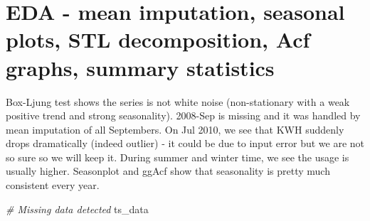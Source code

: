 \documentclass[openany]{book}
\newenvironment{Shaded}{\begin{snugshade}}{\end{snugshade}}
\newcommand{\CommentTok}[1]{\textcolor[rgb]{0.56,0.35,0.01}{\textit{#1}}}
\newcommand{\NormalTok}[1]{#1}
\begin{document}
\hypertarget{eda---mean-imputation-seasonal-plots-stl-decomposition-acf-graphs-summary-statistics}{%
\chapter{EDA - mean imputation, seasonal plots, STL decomposition, Acf
graphs, summary
statistics}\label{eda---mean-imputation-seasonal-plots-stl-decomposition-acf-graphs-summary-statistics}}

Box-Ljung test shows the series is not white noise (non-stationary with
a weak positive trend and strong seasonality). 2008-Sep is missing and
it was handled by mean imputation of all Septembers. On Jul 2010, we see
that KWH suddenly drops dramatically (indeed outlier) - it could be due
to input error but we are not so sure so we will keep it. During summer
and winter time, we see the usage is usually higher. Seasonplot and
ggAcf show that seasonality is pretty much consistent every year.

\begin{Shaded}
\begin{Highlighting}[]
\CommentTok{# Missing data detected}
\NormalTok{ts_data}
\end{Highlighting}
\end{Shaded}
\end{document}
